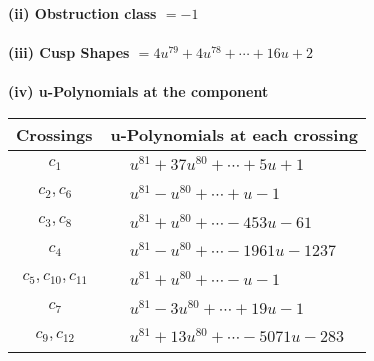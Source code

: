 \documentclass[1p]{elsarticle_modified}
\theoremstyle{definition}
\begin{document}
\flushleft \textbf{(ii) Obstruction class $= -1$}\\~\\
\flushleft \textbf{(iii) Cusp Shapes $= 4 u^{79}+4 u^{78}+\cdots+16 u+2$}\\~\\
\newpage\renewcommand{\arraystretch}{1}
\flushleft \textbf{(iv) u-Polynomials at the component}\newline \\
\begin{tabular}{m{50pt}|m{274pt}}
Crossings & \hspace{64pt}u-Polynomials at each crossing \\
\hline $$\begin{aligned}c_{1}\end{aligned}$$&$\begin{aligned}
&u^{81}+37 u^{80}+\cdots+5 u+1
\end{aligned}$\\
\hline $$\begin{aligned}c_{2},c_{6}\end{aligned}$$&$\begin{aligned}
&u^{81}- u^{80}+\cdots+u-1
\end{aligned}$\\
\hline $$\begin{aligned}c_{3},c_{8}\end{aligned}$$&$\begin{aligned}
&u^{81}+u^{80}+\cdots-453 u-61
\end{aligned}$\\
\hline $$\begin{aligned}c_{4}\end{aligned}$$&$\begin{aligned}
&u^{81}- u^{80}+\cdots-1961 u-1237
\end{aligned}$\\
\hline $$\begin{aligned}c_{5},c_{10},c_{11}\end{aligned}$$&$\begin{aligned}
&u^{81}+u^{80}+\cdots- u-1
\end{aligned}$\\
\hline $$\begin{aligned}c_{7}\end{aligned}$$&$\begin{aligned}
&u^{81}-3 u^{80}+\cdots+19 u-1
\end{aligned}$\\
\hline $$\begin{aligned}c_{9},c_{12}\end{aligned}$$&$\begin{aligned}
&u^{81}+13 u^{80}+\cdots-5071 u-283
\end{aligned}$\\
\hline
\end{tabular}\\~\\
\end{document}
